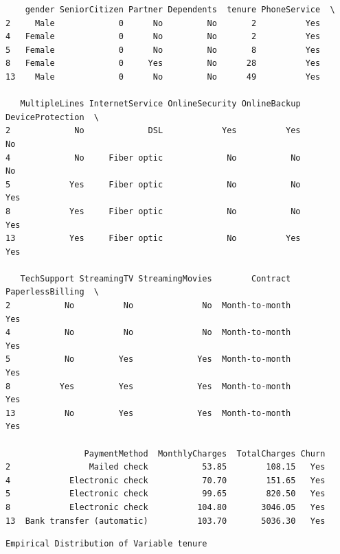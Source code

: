 \documentclass[8pt,onecolumn,aps,pra]{revtex4-1}
\begin{document}
    
    \begin{verbatim}
    gender SeniorCitizen Partner Dependents  tenure PhoneService  \
2     Male             0      No         No       2          Yes   
4   Female             0      No         No       2          Yes   
5   Female             0      No         No       8          Yes   
8   Female             0     Yes         No      28          Yes   
13    Male             0      No         No      49          Yes   

   MultipleLines InternetService OnlineSecurity OnlineBackup DeviceProtection  \
2             No             DSL            Yes          Yes               No   
4             No     Fiber optic             No           No               No   
5            Yes     Fiber optic             No           No              Yes   
8            Yes     Fiber optic             No           No              Yes   
13           Yes     Fiber optic             No          Yes              Yes   

   TechSupport StreamingTV StreamingMovies        Contract PaperlessBilling  \
2           No          No              No  Month-to-month              Yes   
4           No          No              No  Month-to-month              Yes   
5           No         Yes             Yes  Month-to-month              Yes   
8          Yes         Yes             Yes  Month-to-month              Yes   
13          No         Yes             Yes  Month-to-month              Yes   

                PaymentMethod  MonthlyCharges  TotalCharges Churn  
2                Mailed check           53.85        108.15   Yes  
4            Electronic check           70.70        151.65   Yes  
5            Electronic check           99.65        820.50   Yes  
8            Electronic check          104.80       3046.05   Yes  
13  Bank transfer (automatic)          103.70       5036.30   Yes  
    \end{verbatim}

    
    \begin{Verbatim}[commandchars=\\\{\}]
Empirical Distribution of Variable tenure

    \end{Verbatim}

    \begin{center}
    \end{center}
    { \hspace*{\fill} \\}
    
\end{document}
